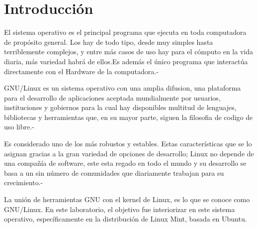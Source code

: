 \documentclass[
  letterpaper, 
  maincolor=black,
  sectioncolor=black!90,
  subsectioncolor=black!70,
  itemtextcolor=black!40,
]{fortysecondscv}
\begin{document}
\usepackage{graphicx}
\usepackage{refstyle}
\usepackage{caption}
\setlength{\parskip}{4mm}
\setlength{\parindent}{12pt}

\makefrontsidebar




\newpage

\section{Introducción}
{\Large
El sistema operativo es el principal programa que ejecuta en toda computadora de propósito general. Los hay de todo tipo, desde muy simples hasta terriblemente complejos, y entre más casos de uso hay para el cómputo en la vida diaria, más variedad habrá de ellos.Es además el único programa que interactúa directamente con el Hardware de la computadora.-\cite{wolf2015fundamentos}}

{\Large 
GNU/Linux es un sistema operativo con una amplia difusion, una plataforma para el desarrollo de aplicaciones aceptada mundialmente por usuarios, instituciones y gobiernos para la cual hay disponibles multitud de lenguajes, bibliotecas y herramientas que, en su mayor parte, siguen la filosofia de codigo de uso libre.-\cite{charte2003programacion}}

{\Large 
Es considerado uno de los más robustos y estables. Estas características que se lo asignan gracias a la gran variedad de opciones de desarrollo; Linux no depende de una compañía de software, este esta regado en todo el mundo y su desarrollo se basa a un sin número de comunidades que diariamente trabajan para su crecimiento.-\cite{badillo2015estudio}}

{\Large 
La unión de herramientas GNU con el kernel de Linux, es lo que se conoce como GNU/Linux. En este laboratorio, el objetivo fue interiorizar en este sistema operativo, específicamente en la distribución de Linux Mint, basada en Ubuntu.} 
\end{document}
